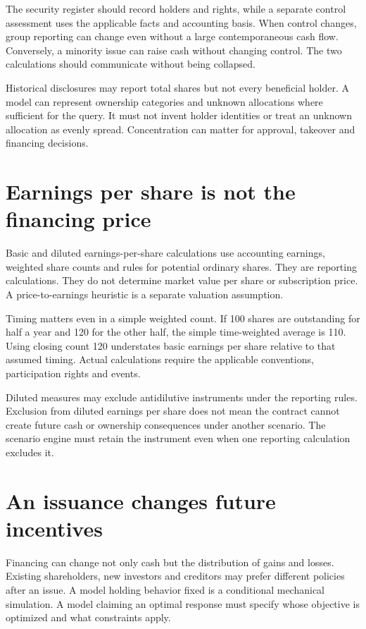 The security register should record holders and rights, while a separate control assessment uses the applicable facts and accounting basis. When control changes, group reporting can change even without a large contemporaneous cash flow. Conversely, a minority issue can raise cash without changing control. The two calculations should communicate without being collapsed.

Historical disclosures may report total shares but not every beneficial holder. A model can represent ownership categories and unknown allocations where sufficient for the query. It must not invent holder identities or treat an unknown allocation as evenly spread. Concentration can matter for approval, takeover and financing decisions.

\section{Earnings per share is not the financing price}
Basic and diluted earnings-per-share calculations use accounting earnings, weighted share counts and rules for potential ordinary shares. They are reporting calculations. They do not determine market value per share or subscription price. A price-to-earnings heuristic is a separate valuation assumption.

Timing matters even in a simple weighted count. If 100 shares are outstanding for half a year and 120 for the other half, the simple time-weighted average is 110. Using closing count 120 understates basic earnings per share relative to that assumed timing. Actual calculations require the applicable conventions, participation rights and events.

Diluted measures may exclude antidilutive instruments under the reporting rules. Exclusion from diluted earnings per share does not mean the contract cannot create future cash or ownership consequences under another scenario. The scenario engine must retain the instrument even when one reporting calculation excludes it.

\section{An issuance changes future incentives}
Financing can change not only cash but the distribution of gains and losses. Existing shareholders, new investors and creditors may prefer different policies after an issue. A model holding behavior fixed is a conditional mechanical simulation. A model claiming an optimal response must specify whose objective is optimized and what constraints apply.

